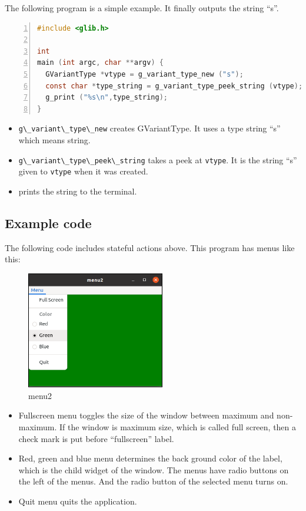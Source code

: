 The following program is a simple example. It finally outputs the string
``s''.

\begin{lstlisting}[language=C, numbers=left]
#include <glib.h>

int
main (int argc, char **argv) {
  GVariantType *vtype = g_variant_type_new ("s");
  const char *type_string = g_variant_type_peek_string (vtype);
  g_print ("%s\n",type_string);
}
\end{lstlisting}

\begin{itemize}
\tightlist
\item
  \passthrough{\lstinline!g\_variant\_type\_new!} creates GVariantType.
  It uses a type string ``s'' which means string.
\item
  \passthrough{\lstinline!g\_variant\_type\_peek\_string!} takes a peek
  at \passthrough{\lstinline!vtype!}. It is the string ``s'' given to
  \passthrough{\lstinline!vtype!} when it was created.
\item
  prints the string to the terminal.
\end{itemize}

\hypertarget{example-code}{%
\subsection{Example code}\label{example-code}}

The following code includes stateful actions above. This program has
menus like this:

\begin{figure}
\centering
\includegraphics[width=6.03cm,height=5.115cm]{../image/menu2.png}
\caption{menu2}
\end{figure}

\begin{itemize}
\tightlist
\item
  Fullscreen menu toggles the size of the window between maximum and
  non-maximum. If the window is maximum size, which is called full
  screen, then a check mark is put before ``fullscreen'' label.
\item
  Red, green and blue menu determines the back ground color of the
  label, which is the child widget of the window. The menus have radio
  buttons on the left of the menus. And the radio button of the selected
  menu turns on.
\item
  Quit menu quits the application.
\end{itemize}

